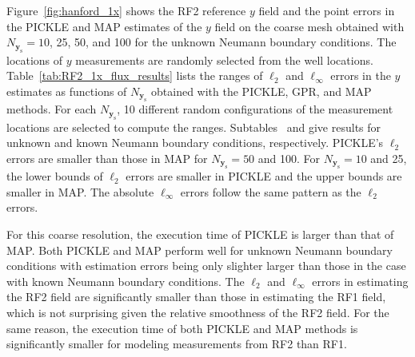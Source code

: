 \documentclass{agujournal2019}
\begin{document}
Figure~\ref{fig:hanford_1x} shows the RF2 reference $y$ field and the point errors in the PICKLE and MAP estimates of the $y$ field on the coarse mesh obtained with $N_{\mathbf{y}_{\mathrm{s}}}=10$, 25, 50, and 100 for the unknown Neumann boundary conditions. The locations of $y$ measurements  are randomly selected from the well locations. 
Table~\ref{tab:RF2_1x_flux_results} lists the ranges of  $\ell_2$ and $\ell_\infty$ errors in the $y$ estimates as functions of $N_{\mathbf{y}_{\mathrm{s}}}$ obtained with the PICKLE, GPR, and MAP methods. For each $N_{\mathbf{y}_{\mathrm{s}}}$, 10 different random configurations of the measurement locations are selected to compute the ranges. Subtables~ and  give results for unknown and known Neumann boundary conditions, respectively. 
PICKLE's $\ell_2$ errors  are smaller than those in MAP for  $N_{\mathbf{y}_{\mathrm{s}}}=50$  and 100. For $N_{\mathbf{y}_{\mathrm{s}}}=10$  and 25, the lower bounds of $\ell_2$ errors are smaller in PICKLE and the upper bounds are smaller in MAP. 
%
The absolute $\ell_\infty$ errors follow the same pattern as the $\ell_2$ errors. 

For this coarse resolution, the execution time of PICKLE is larger than that of MAP.
Both PICKLE and MAP perform well for unknown Neumann boundary conditions with estimation errors being only slighter larger than those in the case with known Neumann boundary conditions.   
The $\ell_2$ and $\ell_\infty$ errors in estimating the RF2 field are significantly smaller than those in estimating the RF1 field, which is not surprising given the relative smoothness of the RF2 field. 
For the same reason, the execution time of both PICKLE and MAP methods is significantly smaller for modeling measurements from RF2 than RF1. 
\end{document}
